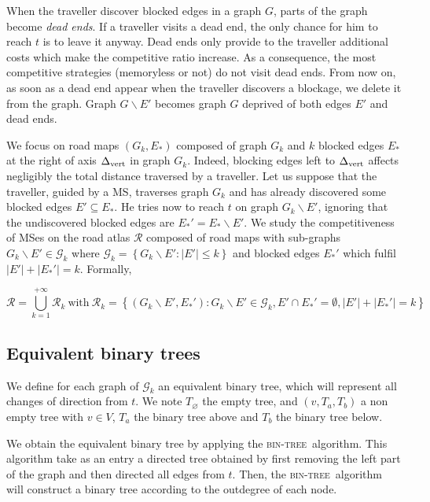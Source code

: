\documentclass[11pt,letterpaper]{article}
\newcommand{\set}[1]{\left\{ #1 \right\}}
\newcommand{\card}[1]{\left| #1 \right|}
\newcommand{\mcalg}{\mathcal{G}}
\newcommand{\mts}{MS}
\newcommand{\deltavert}{\Delta_{\mbox{\scriptsize{vert}}}}
\newcommand{\bintree}{\textsc{bin-tree}}
\begin{document}
When the traveller discover blocked edges in a graph $G$, parts of the graph become \textit{dead ends}. If a traveller visits a dead end, the only chance for him to reach $t$ is to leave it anyway. Dead ends only provide to the traveller additional costs which make the competitive ratio increase. As a consequence, the most competitive strategies (memoryless or not) do not visit dead ends. From now on, as soon as a dead end appear when the traveller discovers a blockage, we delete it from the graph. Graph $G\backslash E'$ becomes graph $G$ deprived of both edges $E'$ and dead ends. 

We focus on road maps $\left(G_k,E_*\right)$ composed of graph $G_k$ and $k$ blocked edges $E_*$ at the right of axis $\deltavert$ in graph $G_k$. Indeed, blocking edges left to $\deltavert$ affects negligibly the total distance traversed by a traveller. Let us suppose that the traveller, guided by a \mts , traverses graph $G_k$ and has already discovered some blocked edges $E' \subseteq E_*$. He tries now to reach $t$ on graph $G_k\backslash E'$, ignoring that the undiscovered blocked edges are $E_*' = E_* \backslash E'$.
We study the competitiveness of \mts es on the road atlas $\mathcal{R}$ composed of road maps with sub-graphs $G_k \backslash E' \in \mcalg_k$ where $\mcalg_k = \set{G_k\backslash E' : \card{E'} \leq k}$ and blocked edges $E_*'$ which fulfil $\card{E'} + \card{E_*'} = k$. Formally,

\begin{equation}
\mathcal{R} = \bigcup\limits_{k=1}^{+\infty} \mathcal{R}_k ~\mbox{with}~ \mathcal{R}_k = \set{\left(G_k\backslash E',E_*'\right): G_k\backslash E' \in \mcalg_k, E' \cap E_*' = \emptyset, \card{E'} + \card{E_*'} = k}
\label{eq:roadatlas}
\end{equation}

\subsection{Equivalent binary trees} \label{subsec:ebt}

We define for each graph of $\mcalg_k$ an equivalent binary tree, which will represent all changes of direction from $t$. We note $T_\varnothing$ the empty tree, and $(v, T_a, T_b)$ a non empty tree with $v \in V$, $T_a$ the binary tree above and $T_b$ the binary tree below.

We obtain the equivalent binary tree by applying the \bintree\ algorithm. This algorithm take as an entry a directed tree obtained by first removing the left part of the graph and then directed all edges from $t$. Then, the \bintree\ algorithm will construct a binary tree according to the outdegree of each node.
\end{document}
